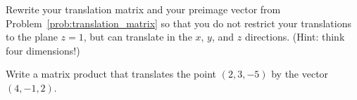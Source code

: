 \documentclass[../gatm_answers.tex]{subfiles}
\begin{document}
\begin{outer_problem}
\item 
\end{outer_problem}

\begin{inner_problem}[start=1]
\item Rewrite your translation matrix and your preimage vector from Problem~\ref{prob:translation_matrix} so that you do not restrict your translations to the plane $z=1$, but can translate in the $x$, $y$, and $z$ directions. (Hint: think four dimensions!)
\end{inner_problem}

\begin{inner_problem}
\item Write a matrix product that translates the point $(2,3,-5)$ by the vector $(4,-1,2)$.
\end{inner_problem}
\end{document}
